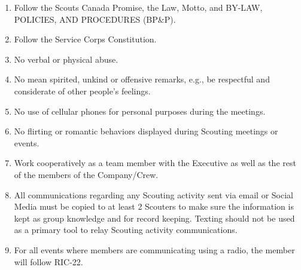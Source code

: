 \documentclass{Service_Corps_Document}
\begin{document}
    \def \Title {Code of Conduct}
    \def \Company {Service Corps}
    \def \versionNumber {3.2}
    \stdFooter
    \begin{titlepage}
        \stdTitlePage
    \end{titlepage}
    \begin{enumerate}
        \item Follow the Scouts Canada Promise, the Law, Motto, and BY-LAW, POLICIES, AND PROCEDURES (BP\&P).
        \item Follow the Service Corps Constitution.
        \item No verbal or physical abuse.
        \item No mean spirited, unkind or offensive remarks, e.g., be respectful and considerate of other people's feelings.
        \item No use of cellular phones for personal purposes during the meetings.
        \item No flirting or romantic behaviors displayed during Scouting meetings or events.
        \item Work cooperatively as a team member with the Executive as well as the rest of the members of the Company/Crew.
        \item All communications regarding any Scouting activity sent via email or Social Media must be copied to at least 2 Scouters to make sure the information is kept as group knowledge and for record keeping.
        Texting should not be used as a primary tool to relay Scouting activity communications.
        \item For all events where members are communicating using a radio, the member will follow RIC-22.
    \end{enumerate}
\end{document}
